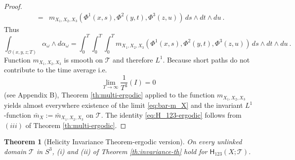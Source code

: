 \documentclass[12pt]{article}
\newtheorem{theorem}{Theorem}[section]
\begin{document}
\begin{proof}
\begin{eqnarray*}
 & = & m_{X_1,X_2,X_3}(\Phi^1(x,s),\Phi^2(y,t),\Phi^3(z,u))\,ds\wedge dt\wedge du\ .
\end{eqnarray*}
Thus 
\[
\int_{\mathscr{O}(x,y,z;T)}
\alpha_\omega\wedge d\alpha_\omega=\int^T_0\int^T_0\int^T_0 m_{X_1,X_2,X_3}(\Phi^1(x,s),\Phi^2(y,t),\Phi^3(z,u))\,ds\wedge dt\wedge du\ .
\]
Function $m_{X_1,X_2,X_3}$ is smooth on $\mathcal{T}$ and therefore $L^1$. Because short paths do not contribute to the time average i.e.
\[
 \lim_{T\to\infty} \frac{1}{T^3}(I)=0
\]
(see Appendix B), Theorem \ref{th:multi-ergodic} applied to the function $m_{X_1,X_2,X_3}$ yields almost everywhere existence of the limit \eqref{eq:bar-m_X} and the invariant $L^1$-function $\bar{m}_X:=\bar{m}_{X_1,X_2,X_3}$ on $\mathcal{T}$. The identity \eqref{eq:H_123-ergodic} 
follows from $(iii)$ of Theorem \ref{th:multi-ergodic}.
\end{proof}

\begin{theorem}[Helicity Invariance Theorem-ergodic version]\label{th:invariance-th-ergodic}
 On every unlinked domain $\mathcal{T}$ in $S^3$, (i) and (ii) of Theorem 
 \ref{th:invariance-th} hold for $\mathsf{H}_{123}(X;\mathcal{T})$.
 \end{theorem}
\end{document}
